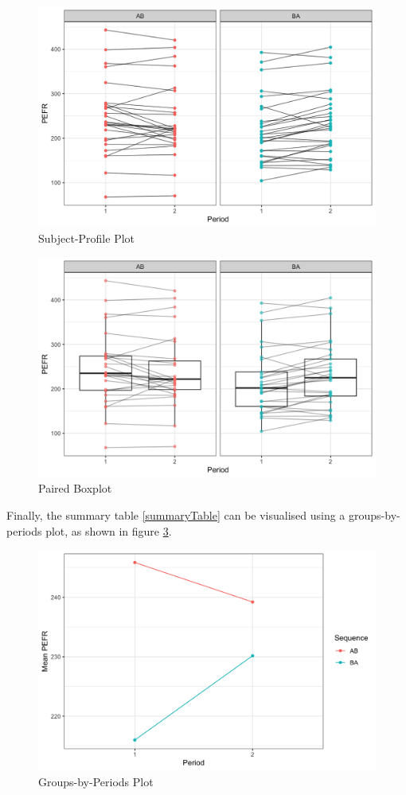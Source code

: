 \documentclass[12pt, TexShade, letterpaper]{report}
\begin{document}
\begin{figure}[ht]
    \centering
    \includegraphics[width=0.85\linewidth]{report/figures/subjectProfilesPlot.png}
    \caption{Subject-Profile Plot}
    \label{fig:subjectprofile}
\end{figure}
\begin{figure}[ht]
    \centering
    \includegraphics[width=0.85\linewidth]{report/figures/pairedboxplot.png}
    \caption{Paired Boxplot}
    \label{fig:pairedboxplot}
\end{figure}

Finally, the summary table \ref{summaryTable} can be visualised using a groups-by-periods plot, as shown in figure \ref{fig:groupsbyperiods}.
\begin{figure}[ht]
    \centering
    \includegraphics[width=0.85\linewidth]{report/figures/groupsByPeriodsPlot.png}
    \caption{Groups-by-Periods Plot}
    \label{fig:groupsbyperiods}
\end{figure}
\end{document}
